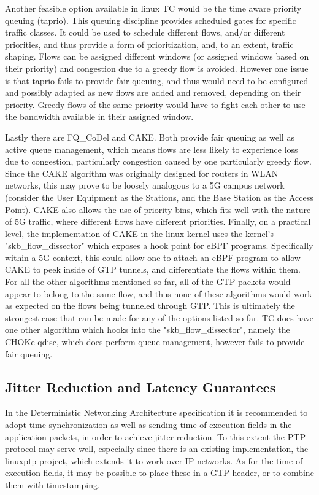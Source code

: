 Another feasible option available in linux TC would be the time aware priority queuing (taprio). This queuing discipline provides scheduled gates for specific traffic classes. It could be used to schedule different flows, and/or different priorities, and thus provide a form of prioritization, and, to an extent, traffic shaping. Flows can be assigned different windows (or assigned windows based on their priority) and congestion due to a greedy flow is avoided. However one issue is that taprio fails to provide fair queuing, and thus would need to be configured and possibly adapted as new flows are added and removed, depending on their priority. Greedy flows of the same priority would have to fight each other to use the bandwidth available in their assigned window.

Lastly there are FQ\_CoDel and CAKE. Both provide fair queuing as well as active queue management, which means flows are less likely to experience loss due to congestion, particularly congestion caused by one particularly greedy flow. Since the CAKE algorithm was originally designed for routers in WLAN networks, this may prove to be loosely analogous to a 5G campus network (consider the User Equipment as the Stations, and the Base Station as the Access Point). CAKE also allows the use of priority bins, which fits well with the nature of 5G traffic, where different flows have different priorities. Finally, on a practical level, the implementation of CAKE in the linux kernel uses the kernel's "skb\_flow\_dissector" which exposes a hook point for eBPF \cite{eBPF} programs. Specifically within a 5G context, this could allow one to attach an eBPF program to allow CAKE to peek inside of GTP tunnels, and differentiate the flows within them. For all the other algorithms mentioned so far, all of the GTP packets would appear to belong to the same flow, and thus none of these algorithms would work as expected on the flows being tunneled through GTP. This is ultimately the strongest case that can be made for any of the options listed so far. TC does have one other algorithm which hooks into the "skb\_flow\_dissector", namely the CHOKe qdisc, which does perform queue management, however fails to provide fair queuing.

\subsection{Jitter Reduction and Latency Guarantees}

In the Deterministic Networking Architecture specification it is recommended to adopt time synchronization as well as sending time of execution fields in the application packets, in order to achieve jitter reduction. To this extent the PTP protocol may serve well, especially since there is an existing implementation, the linuxptp project, which extends it to work over IP networks. As for the time of execution fields, it may be possible to place these in a GTP header, or to combine them with timestamping.

